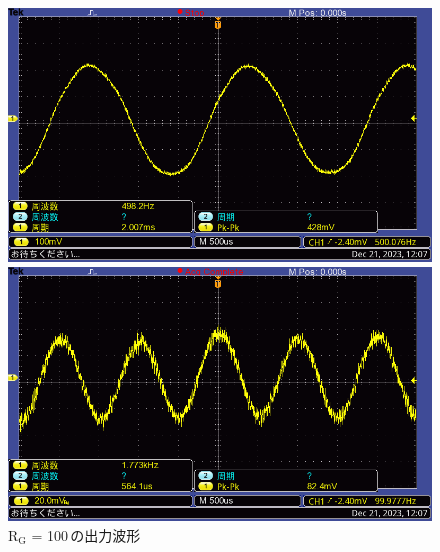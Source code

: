 \documentclass{ltjsarticle}
\begin{document}
\begin{figure}[H]
\begin{minipage}{0.4\columnwidth}
			\end{minipage}
			\hspace{0.04\columnwidth}
			\begin{minipage}{0.4\columnwidth}
			\centering
			\includegraphics[width = \columnwidth]{figs/F0009TEK.PNG}
			\end{minipage}
			\hspace{0.04\columnwidth}
			\begin{minipage}{0.4\columnwidth}
			\centering
			\includegraphics[width = \columnwidth]{figs/F0010TEK.PNG}
			\end{minipage}
			\caption{$\mathrm{R_G}$ = 100\,\Omega の出力波形}
			\label{fig:week5-1-100}
			\end{figure}
\end{document}
